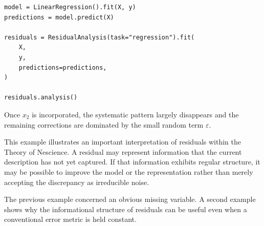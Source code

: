 \begin{example}
\begin{sourcecode}
{\scriptsize
\begin{verbatim}
model = LinearRegression().fit(X, y)
predictions = model.predict(X)

residuals = ResidualAnalysis(task="regression").fit(
    X,
    y,
    predictions=predictions,
)

residuals.analysis()
\end{verbatim}}
\end{sourcecode}

Once \(x_2\) is incorporated, the systematic pattern largely disappears and the
remaining corrections are dominated by the small random term
\(\varepsilon\).

This example illustrates an important interpretation of residuals within the
Theory of Nescience. A residual may represent information that the current
description has not yet captured. If that information exhibits regular structure,
it may be possible to improve the model or the representation rather than merely
accepting the discrepancy as irreducible noise.
\end{example}

The previous example concerned an obvious missing variable. A second example
shows why the informational structure of residuals can be useful even when a
conventional error metric is held constant.

